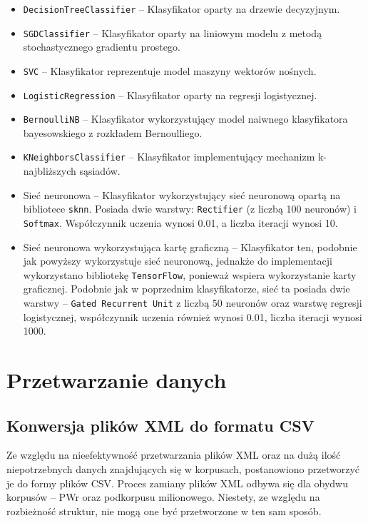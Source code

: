 	\begin{itemize}
	\item \texttt{DecisionTreeClassifier} -- Klasyfikator oparty na drzewie decyzyjnym.
	\item \texttt{SGDClassifier} -- Klasyfikator oparty na liniowym modelu z metodą stochastycznego gradientu prostego.
	\item \texttt{SVC} -- Klasyfikator reprezentuje model maszyny wektorów nośnych.
	\item \texttt{LogisticRegression} -- Klasyfikator oparty na regresji logistycznej.
	\item \texttt{BernoulliNB} -- Klasyfikator wykorzystujący model naiwnego klasyfikatora bayesowskiego z rozkładem Bernoulliego.
	\item \texttt{KNeighborsClassifier} -- Klasyfikator implementujący mechanizm k-najbliższych sąsiadów.
	\item Sieć neuronowa -- Klasyfikator wykorzystujący sieć neuronową opartą na bibliotece \texttt{sknn}. Posiada dwie warstwy: \texttt{Rectifier} (z liczbą 100 neuronów) i \texttt{Softmax}. Współczynnik uczenia wynosi 0.01, a liczba iteracji wynosi 10.
	\item Sieć neuronowa wykorzystująca kartę graficzną -- Klasyfikator ten, podobnie jak powyższy wykorzystuje sieć neuronową, jednakże do implementacji wykorzystano bibliotekę \texttt{TensorFlow}, ponieważ wspiera wykorzystanie karty graficznej. Podobnie jak w poprzednim klasyfikatorze, sieć ta posiada dwie warstwy -- \texttt{Gated Recurrent Unit} z liczbą 50 neuronów oraz warstwę regresji logistycznej, współczynnik uczenia również wynosi 0.01, liczba iteracji wynosi 1000.
	\end{itemize}
	
	\section{Przetwarzanie danych}
	\subsection{Konwersja plików XML do formatu CSV}
	Ze względu na nieefektywność przetwarzania plików XML oraz na dużą ilość niepotrzebnych danych znajdujących się w korpusach, postanowiono przetworzyć je do formy plików CSV.
Proces zamiany plików XML odbywa się dla obydwu korpusów -- PWr oraz podkorpusu milionowego.
	Niestety, ze względu na rozbieżność struktur, nie mogą one być przetworzone w ten sam sposób.
	
